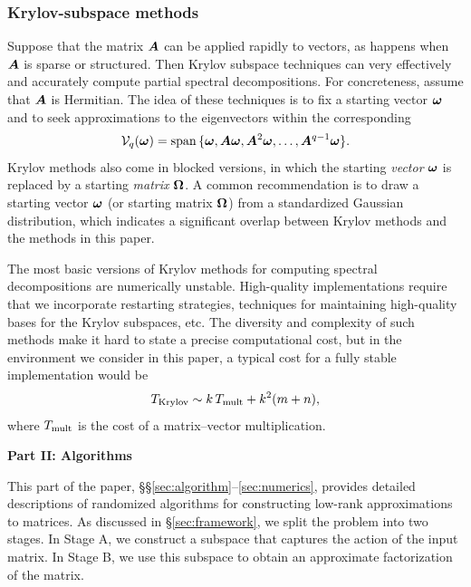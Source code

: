 \documentclass[final]{siamltex}
\newcounter{algorithm}[section]
\begin{document}
\subsubsection{Krylov-subspace methods}
\label{sec:krylov}

Suppose that the matrix $\bm{A}$ can be applied rapidly to vectors,
as happens when $\bm{A}$ is sparse or structured.
Then Krylov subspace techniques can very effectively
and accurately compute partial spectral decompositions.
For concreteness, assume that $\bm{A}$ is Hermitian.
The idea of these techniques is to fix a starting vector $\bm{\omega}$
and to seek approximations to the eigenvectors within the corresponding 
$$
{\cal V}_q(\vct{\omega}) = \lspan\{ \vct{\omega}, \mtx{A}\vct{\omega},
\mtx{A}^2 \vct{\omega}, \dots, \mtx{A}^{q-1} \vct{\omega} \}.
$$
Krylov methods also come in blocked versions, in which the starting \textit{vector}
$\bm{\omega}$ is replaced by a starting \textit{matrix} $\bm{\Omega}$.
A common recommendation is to draw a starting vector $\bm{\omega}$
(or starting matrix $\bm{\Omega}$) from a standardized Gaussian
distribution, which indicates a significant overlap
between Krylov methods and the methods in this paper.

The most basic versions of Krylov methods for computing spectral
decompositions are numerically unstable.  High-quality
implementations require that we incorporate restarting
strategies, techniques for maintaining high-quality bases for the
Krylov subspaces, etc. The diversity and complexity of
such methods make it hard to state a precise computational
cost, but in the environment we consider in this paper,
a typical cost for a fully stable implementation would be
\begin{equation}
\label{eq:Tkrylov}
T_{\rm Krylov} \sim k \, T_{\rm mult} + k^2 (m+n),
\end{equation}
where $T_{\rm mult}$ is the cost of a matrix--vector multiplication.

\vspace{0.5in}

\begin{center}
{\bf Part II: Algorithms}
\end{center}

\lsp

This part of the paper, \S\S\ref{sec:algorithm}--\ref{sec:numerics},
provides detailed descriptions of randomized algorithms for constructing
low-rank approximations to matrices.  As discussed in \S\ref{sec:framework},
we split the problem into two stages.  In Stage A, we construct a subspace that captures
the action of the input matrix.  In Stage B, we use this subspace to obtain an
approximate factorization of the matrix.
\end{document}
